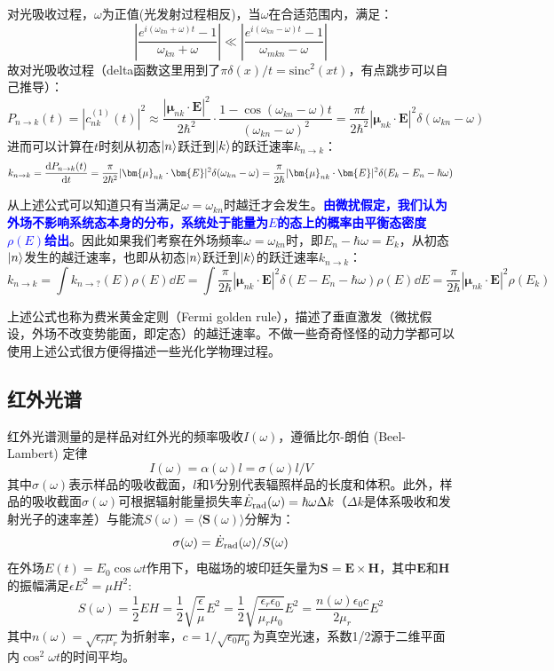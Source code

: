 对光吸收过程，$\omega$为正值(光发射过程相反)，当$\omega$在合适范围内，满足：
\[\left|\frac{e^{i(\omega_{kn}+\omega)t}-1}{\omega_{kn} + \omega}\right| \ll \left|\frac{e^{i(\omega_{kn}-\omega)t}-1}{\omega_{mkn}-\omega}\right|\]
故对光吸收过程（delta函数这里用到了$\pi\delta(x)/t=\mathrm{sinc}^2(xt)$，有点跳步可以自己推导）：
\[P_{n \to k}(t)=|c_{nk}^{(1)}(t)|^2\approx\frac{|\bm{\mu}_{nk}\cdot\bm{E}|^2}{2\hbar^2}\cdot\frac{1-\cos{(\omega_{kn}-\omega)t}}{(\omega_{kn}-\omega)^2}=\frac{\pi t}{2\hbar^2}|\bm{\mu}_{nk}\cdot\bm{E}|^2\delta(\omega_{kn}-\omega)\]
进而可以计算在$t$时刻从初态$\ket{n}$跃迁到$\ket{k}$的跃迁速率$k_{n \to k}$：
\begin{equation}\label{eq:fgr}
k_{n \to k}=\dv{P_{n \to k}(t)}{t}=\frac{\pi}{2\hbar^2}|\bm{\mu}_{nk}\cdot\bm{E}|^2\delta(\omega_{kn}-\omega)=\frac{\pi}{2\hbar}|\bm{\mu}_{nk}\cdot\bm{E}|^2\delta(E_k-E_n-\hbar\omega)
\end{equation}

从上述公式可以知道只有当满足$\omega=\omega_{kn}$时越迁才会发生。\textcolor{blue}{\textbf{由微扰假定，我们认为外场不影响系统态本身的分布，系统处于能量为$E$的态上的概率由平衡态密度$\rho(E)$给出}}。因此如果我们考察在外场频率$\omega=\omega_{kn}$时，即$E_n-\hbar\omega=E_k$，从初态$\ket{n}$发生的越迁速率，也即从初态$\ket{n}$跃迁到$\ket{k}$的跃迁速率$k_{n \to k}$：
\[k_{n \to k}=\int k_{n \to ?}(E)\rho(E)\dd{E}=\int \frac{\pi}{2\hbar}|\bm{\mu}_{nk}\cdot\bm{E}|^2\delta(E-E_n-\hbar\omega)\rho(E)\dd{E}=\frac{\pi}{2\hbar}|\bm{\mu}_{nk}\cdot\bm{E}|^2\rho(E_k)\]

上述公式也称为费米黄金定则（Fermi golden rule），描述了垂直激发（微扰假设，外场不改变势能面，即定态）的越迁速率。不做一些奇奇怪怪的动力学都可以使用上述公式很方便得描述一些光化学物理过程。

\newpage
\subsection{红外光谱}
红外光谱测量的是样品对红外光的频率吸收$I(\omega)$，遵循比尔-朗伯 (Beel-Lambert) 定律
\[I(\omega)=\alpha(\omega)l=\sigma(\omega)l/V\]
其中$\sigma(\omega)$表示样品的吸收截面，$l$和$V$分别代表辐照样品的长度和体积。此外，样品的吸收截面$\sigma(\omega)$可根据辐射能量损失率$\dot{E}_{\rm{rad}}(\omega)=\hbar\omega\Delta k$（$\Delta k$是体系吸收和发射光子的速率差）与能流$S(\omega)=\langle\mathbf{S}(\omega)\rangle$分解为：
\[\sigma(\omega)=\dot{E}_{\rm{rad}}(\omega)/S(\omega)\]
在外场$E(t) = E_0 \cos \omega t$作用下，电磁场的坡印廷矢量为$\mathbf{S}=\mathbf{E} \times \mathbf{H}$，其中$\mathbf{E}$和$\mathbf{H}$的振幅满足$\epsilon E^2=\mu H^2$:
\[S(\omega)=\frac{1}{2}EH=\frac{1}{2}\sqrt{\frac{\epsilon}{\mu}}E^2=\frac{1}{2}\sqrt{\frac{\epsilon_r\epsilon_0}{\mu_r\mu_0}}E^2=\frac{n(\omega)\epsilon_0c}{2\mu_r}E^2\]
其中$n(\omega)=\sqrt{\epsilon_r\mu_r}$为折射率，$c=1/\sqrt{\epsilon_0\mu_0}$为真空光速，系数1/2源于二维平面内$\cos^2\omega t$的时间平均。

